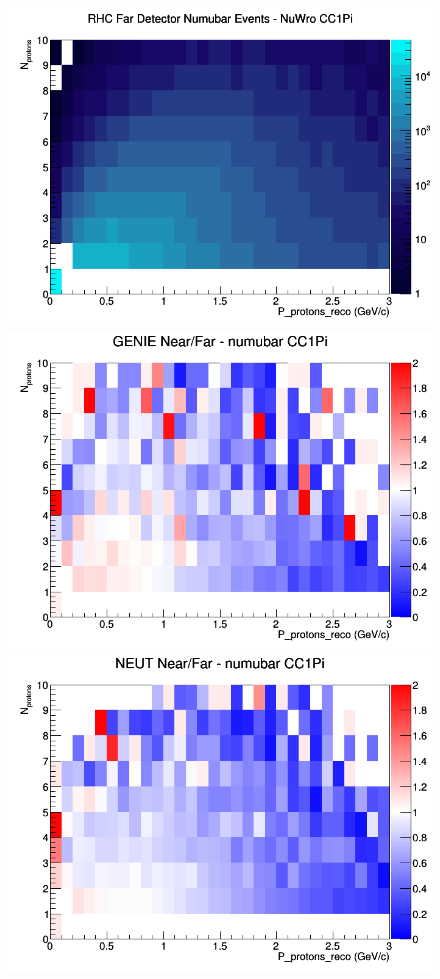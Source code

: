 \begin{figure}[h]
\endminipage
{}
\includegraphics[width=\linewidth]{eff_N_P/LAr/protons/CC1Pi_RHC_FD_numubar_N_P_NuWro.png}
\endminipage
\newline
{}
\includegraphics[width=\linewidth]{eff_N_P/LAr/protons/ratios/CC1Pi_GENIE_numubar_NF_N_P.png}
\endminipage
{}
\includegraphics[width=\linewidth]{eff_N_P/LAr/protons/ratios/CC1Pi_NEUT_numubar_NF_N_P.png}

\end{figure}

